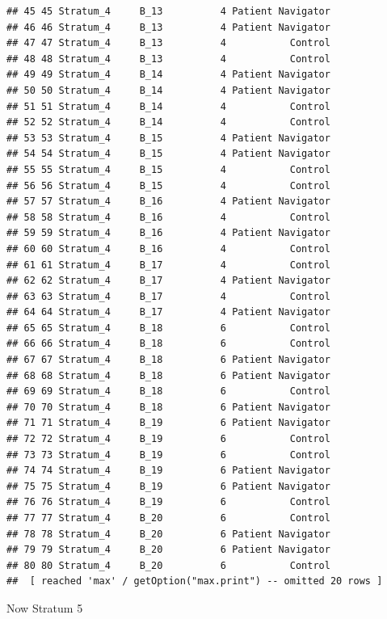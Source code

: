 \documentclass[
]{book}
\newenvironment{Shaded}{\begin{snugshade}}{\end{snugshade}}
\newcommand{\DataTypeTok}[1]{\textcolor[rgb]{0.13,0.29,0.53}{#1}}
\newcommand{\DecValTok}[1]{\textcolor[rgb]{0.00,0.00,0.81}{#1}}
\newcommand{\KeywordTok}[1]{\textcolor[rgb]{0.13,0.29,0.53}{\textbf{#1}}}
\newcommand{\NormalTok}[1]{#1}
\newcommand{\OperatorTok}[1]{\textcolor[rgb]{0.81,0.36,0.00}{\textbf{#1}}}
\newcommand{\StringTok}[1]{\textcolor[rgb]{0.31,0.60,0.02}{#1}}
\begin{document}
\begin{verbatim}
## 45 45 Stratum_4     B_13          4 Patient Navigator
## 46 46 Stratum_4     B_13          4 Patient Navigator
## 47 47 Stratum_4     B_13          4           Control
## 48 48 Stratum_4     B_13          4           Control
## 49 49 Stratum_4     B_14          4 Patient Navigator
## 50 50 Stratum_4     B_14          4 Patient Navigator
## 51 51 Stratum_4     B_14          4           Control
## 52 52 Stratum_4     B_14          4           Control
## 53 53 Stratum_4     B_15          4 Patient Navigator
## 54 54 Stratum_4     B_15          4 Patient Navigator
## 55 55 Stratum_4     B_15          4           Control
## 56 56 Stratum_4     B_15          4           Control
## 57 57 Stratum_4     B_16          4 Patient Navigator
## 58 58 Stratum_4     B_16          4           Control
## 59 59 Stratum_4     B_16          4 Patient Navigator
## 60 60 Stratum_4     B_16          4           Control
## 61 61 Stratum_4     B_17          4           Control
## 62 62 Stratum_4     B_17          4 Patient Navigator
## 63 63 Stratum_4     B_17          4           Control
## 64 64 Stratum_4     B_17          4 Patient Navigator
## 65 65 Stratum_4     B_18          6           Control
## 66 66 Stratum_4     B_18          6           Control
## 67 67 Stratum_4     B_18          6 Patient Navigator
## 68 68 Stratum_4     B_18          6 Patient Navigator
## 69 69 Stratum_4     B_18          6           Control
## 70 70 Stratum_4     B_18          6 Patient Navigator
## 71 71 Stratum_4     B_19          6 Patient Navigator
## 72 72 Stratum_4     B_19          6           Control
## 73 73 Stratum_4     B_19          6           Control
## 74 74 Stratum_4     B_19          6 Patient Navigator
## 75 75 Stratum_4     B_19          6 Patient Navigator
## 76 76 Stratum_4     B_19          6           Control
## 77 77 Stratum_4     B_20          6           Control
## 78 78 Stratum_4     B_20          6 Patient Navigator
## 79 79 Stratum_4     B_20          6 Patient Navigator
## 80 80 Stratum_4     B_20          6           Control
##  [ reached 'max' / getOption("max.print") -- omitted 20 rows ]
\end{verbatim}

Now Stratum 5

\begin{Shaded}
\end{Shaded}
\end{document}
